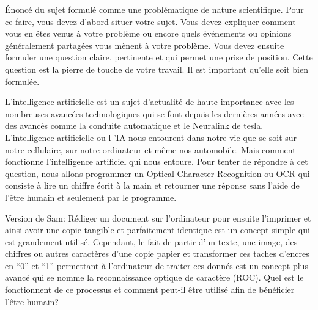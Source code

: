 Énoncé du sujet formulé comme une problématique de nature scientifique. Pour ce faire, vous devez
d’abord situer votre sujet. Vous devez expliquer comment vous en êtes venus à votre problème ou encore
quels événements ou opinions généralement partagées vous mènent à votre problème. Vous devez ensuite
formuler une question claire, pertinente et qui permet une prise de position. Cette question est la pierre
de touche de votre travail. Il est important qu’elle soit bien formulée. 

L'intelligence artificielle est un sujet d'actualité de haute importance avec les nombreuses avancées 
technologiques qui se font depuis les dernières années avec des avancés comme la conduite automatique et le Neuralink
de tesla. L'intelligence artificielle ou l 'IA nous entourent dans notre vie que se soit sur notre cellulaire, sur notre ordinateur
et même nos automobile. Mais comment fonctionne l'intelligence artificiel qui nous entoure. Pour tenter de répondre à cet question, 
nous allons programmer un Optical Character Recognition ou OCR qui consiste à lire un chiffre écrit à la main et retourner une réponse 
sans l'aide de l'être humain et seulement par le programme.

Version de Sam:
Rédiger un document sur l’ordinateur pour ensuite l’imprimer et ainsi avoir une copie tangible et parfaitement 
identique est un concept simple qui est grandement utilisé. Cependant, le fait de partir d’un texte, une image, 
des chiffres ou autres caractères d’une copie papier et transformer ces taches d’encres en “0” et “1” permettant 
à l’ordinateur de traiter ces donnés est un concept plus avancé qui se nomme la reconnaissance optique de caractère (ROC). 
Quel est le fonctionnent de ce processus et comment peut-il être utilisé afin de bénéficier l’être humain?
